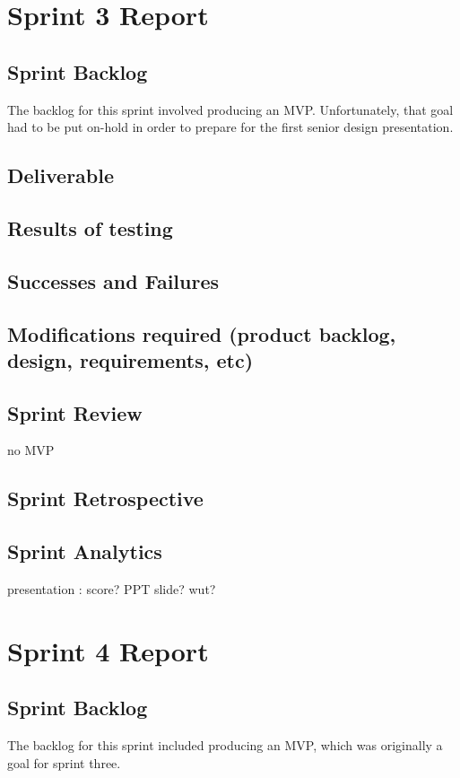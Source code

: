 \section{Sprint 3 Report}
\subsection{Sprint Backlog}

The backlog for this sprint involved producing an MVP. Unfortunately, that goal had to be put on-hold in order to prepare for the first senior design presentation.

\subsection{Deliverable}
\subsection{Results of testing}
\subsection{Successes and Failures}
\subsection{Modifications required (product backlog, design, requirements, etc)}
\subsection{Sprint Review}

no MVP
\subsection{Sprint Retrospective}
\subsection{Sprint Analytics} 
presentation : score? PPT slide? wut?

\section{Sprint 4 Report}
\subsection{Sprint Backlog}

The backlog for this sprint included producing an MVP, which was originally a goal for sprint three.

